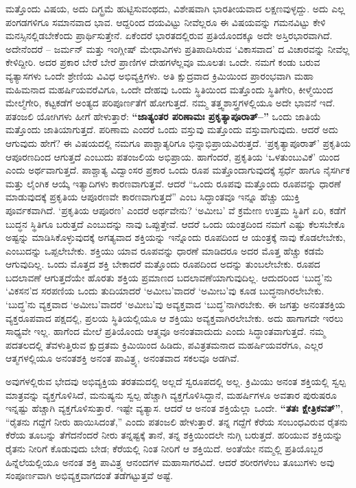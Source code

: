 ಮತ್ತೊಂದು ವಿಷಯ, ಅದು ದಿಗ್ಭ್ರಮೆ ಹುಟ್ಟಿಸುವಂಥದು, ವಿಶೇಷವಾಗಿ ಭಾರತೀಯವಾದ ಲಕ್ಷಣವುಳ್ಳದ್ದು. ಅದು ಎಲ್ಲ ಪಂಗಡಗಳಿಗೂ ಸಮಾನವಾದ ಭಾವ. ಆದ್ದರಿಂದ ದಯವಿಟ್ಟು ನೀವೆಲ್ಲರೂ ಈ ವಿಷಯವನ್ನು ಗಮನವಿಟ್ಟು ಕೇಳಿ ಮನಸ್ಸಿನಲ್ಲಿಡಬೇಕೆಂದು ಪ್ರಾರ್ಥಿಸುತ್ತೇನೆ. ಏಕೆಂದರೆ ಭಾರತದಲ್ಲಿರುವ ಪ್ರತಿಯೊಂದಕ್ಕೂ ಅದೇ ಅಸ್ತಿರಭಾರವಾಗಿದೆ. ಅದೇನೆಂದರೆ – ಜರ್ಮನ್​ ಮತ್ತು ಇಂಗ್ಲೀಷ್​ ಮೇಧಾವಿಗಳು ಪ್ರತಿಪಾದಿಸಿರುವ ‘ವಿಕಾಸವಾದ’ ದ ವಿಚಾರವನ್ನು ನೀವೆಲ್ಲ ಕೇಳಿದ್ದೀರಿ. ಅದರ ಪ್ರಕಾರ ಬೇರೆ ಬೇರೆ ಪ್ರಾಣಿಗಳ ದೇಹಗಳೆಲ್ಲವೂ ಮೂಲತಃ ಒಂದೇ. ನಮಗೆ ಕಂಡು ಬರುವ ವ್ಯತ್ಯಾಸಗಳು ಒಂದೇ ಶ್ರೇಣಿಯ ವಿವಿಧ ಅಭಿವ್ಯಕ್ತಿಗಳು. ಅತಿ ಕ್ಷುದ್ರವಾದ ಕ್ರಿಮಿಯಿಂದ ಪ್ರಾರಂಭವಾಗಿ ಮಹಾ ಮಹಿಮನಾದ ಮಹರ್ಷಿಯವರೆವಿಗೂ, ಒಂದೇ ದೇಹವು ಒಂದು ಸ್ಥಿತಿಯಿಂದ ಮತ್ತೊಂದು ಸ್ಥಿತಿಗೇರಿ, ಕೀಳ್ಮೆಯಿಂದ ಮೇಲ್ಮೆಗೇರಿ, ಕಟ್ಟಕಡೆಗೆ ಅಂತ್ಯದ ಪರಿಪೂರ್ಣತೆಗೆ ಹೋಗುತ್ತದೆ. ನಮ್ಮ ತತ್ತ್ವಶಾಸ್ತ್ರಗಳಲ್ಲಿಯೂ ಅದೇ ಭಾವನೆ ಇದೆ. ಪತಂಜಲಿ ಯೋಗಿಗಳು ಹೀಗೆ ಹೇಳುತ್ತಾರೆ: \textbf{“ಜಾತ್ಯಂತರ ಪರಿಣಾಮಃ ಪ್ರಕೃತ್ಯಾಪೂರಾತ್​–”} ಒಂದು ಜಾತಿಯೆ ಮತ್ತೊಂದು ಜಾತಿಯಾಗುತ್ತದೆ. ಪರಿಣಾಮ ಎಂದರೆ ಒಂದು ವಸ್ತುವು ಮತ್ತೊಂದು ವಸ್ತುವಾಗುವುದು. ಆದರೆ ಅದು ಆಗುವುದು ಹೇಗೆ? ಈ ವಿಷಯದಲ್ಲಿ ನಮಗೂ ಪಾಶ್ಚಾತ್ಯರಿಗೂ ಭಿನ್ನಾಭಿಪ್ರಾಯವಿರುತ್ತದೆ. ‘ಪ್ರಕೃತ್ಯಾಪೂರಾತ್​’ ಪ್ರಕೃತಿಯ ಆಪೂರಣದಿಂದ ಆಗುತ್ತದೆ ಎಂಬುದು ಪತಂಜಲಿಯ ಅಭಿಪ್ರಾಯ. ಹಾಗೆಂದರೆ, ಪ್ರಕೃತಿಯ ‘ಒಳತುಂಬುವಿಕೆ’ ಯಿಂದ ಎಂದು ಅರ್ಥವಾಗುತ್ತದೆ. ಪಾಶ್ಚಾತ್ಯ ವಿದ್ವಾಂಸರ ಪ್ರಕಾರ ಒಂದು ರೂಪ ಮತ್ತೊಂದಾಗುವುದಕ್ಕೆ ಸ್ಫರ್ಧೆ ಹಾಗೂ ನೈಸರ್ಗಿಕ ಮತ್ತು ಲೈಂಗಿಕ ಆಯ್ಕೆ ಇತ್ಯಾದಿಗಳು  ಕಾರಣವಾಗುತ್ತವೆ. ಆದರೆ “ಒಂದು ರೂಪವು ಮತ್ತೊಂದು ರೂಪವನ್ನು ಧಾರಣೆ ಮಾಡುವುದಕ್ಕೆ ಪ್ರಕೃತಿಯ ಆಪೂರಣವೇ ಕಾರಣವಾಗುತ್ತದೆ” ಎಂಬ ಸಿದ್ಧಾಂತವೂ ಇನ್ನೂ ಹೆಚ್ಚು ಯುಕ್ತಿ ಪೂರ್ವಕವಾಗಿದೆ. ‘ಪ್ರಕೃತಿಯ ಆಪೂರಣ’ ಎಂದರೆ ಅರ್ಥವೇನು? ‘ಅಮೀಬ’ ವೆ  ಕ್ರಮೇಣ ಉತ್ತಮ ಸ್ಥಿತಿಗೆ ಏರಿ, ಕಡೆಗೆ ಬುದ್ಧನ ಸ್ಥಿತಿಗೂ ಬರುತ್ತದೆ ಎಂಬುದನ್ನು ನಾವು ಒಪ್ಪುತ್ತೇವೆ. ಆದರೆ ಒಂದು ಯಂತ್ರದಿಂದ ನಮಗೆ ಎಷ್ಟು ಕೆಲಸಬೇಕೊ ಅಷ್ಟನ್ನು ಮಾಡಿಸಿಕೊಳ್ಳುವುದಕ್ಕೆ ಅಗತ್ಯವಾದ ಶಕ್ತಿಯನ್ನು ಇನ್ನೊಂದು ರೂಪದಿಂದ ಆ ಯಂತ್ರಕ್ಕೆ ನಾವು ಕೊಡಲೇಬೇಕು, ಎಂಬುದನ್ನು ಒಪ್ಪಲೇಬೇಕು. ಶಕ್ತಿಯು ಯಾವ ರೂಪವನ್ನು ಧಾರಣೆ ಮಾಡಿದರೂ ಅದರ ಮೊತ್ತ ಹೆಚ್ಚು ಕಡಮೆ ಆಗುವುದಿಲ್ಲ. ಒಂದು ಮೊತ್ತದ ಶಕ್ತಿ ಬೇಕಾದರೆ ಮತ್ತೊಂದು ರೂಪದಿಂದ ಅದನ್ನು ತುಂಬಲೇಬೇಕು. ರೂಪದ ಬದಲಾವಣೆ ಆಗುತ್ತದೆಯೇ ಹೊರತು ಶಕ್ತಿಯ ಪ್ರಮಾಣದ ಬದಲಾವಣೆಯಾಗುವುದಿಲ್ಲ. ಆದುದರಿಂದ ‘ಬುದ್ಧ’ನು ‘ವಿಕಸನ’ದ ಸರಪಣಿಯ ಒಂದು ತುದಿಯಾದರೆ ‘ಅಮೀಬ’ವಾದರೆ ‘ಅಮೀಬ’ವು ಕೂಡ ಬುದ್ಧನಾಗಿರಲೇಬೇಕು. ‘ಬುದ್ಧ’ನು ವ್ಯಕ್ತವಾದ ‘ಅಮೀಬ’ವಾದರೆ ‘ಅಮೀಬ’ವು ಅವ್ಯಕ್ತವಾದ ‘ಬುದ್ಧ’ನಾಗಿರಬೇಕು. ಈ ಜಗತ್ತು ಅನಂತಶಕ್ತಿಯ ವ್ಯಕ್ತರೂಪವಾದ ಪಕ್ಷದಲ್ಲಿ, ಪ್ರಲಯ ಸ್ಥಿತಿಯಲ್ಲಿಯೂ ಆ ಶಕ್ತಿಯು ಅವ್ಯಕ್ತವಾಗಿರಲೇಬೇಕು. ಅದು ಹಾಗಾಗದೇ ಇರಲು ಸಾಧ್ಯವೇ ಇಲ್ಲ. ಹಾಗೆಂದ ಮೇಲೆ ಪ್ರತಿಯೊಂದು ಆತ್ಮವೂ ಅನಂತವಾದುದು ಎಂದು ಸಿದ್ಧಾಂತವಾಗುತ್ತದೆ. ನಮ್ಮ ಪದತಲದಲ್ಲಿ ತೆವಳುತ್ತಿರುವ ಕ್ಷುದ್ರತಮ ಕ್ರಿಮಿಯಿಂದ ಹಿಡಿದು, ಪವಿತ್ರತಮನಾದ ಮಹರ್ಷಿಯವರೆಗೂ, ಎಲ್ಲರ ಆತ್ಮಗಳಲ್ಲಿಯೂ ಅನಂತಶಕ್ತಿ ಅನಂತ ಪಾವಿತ್ರ್ಯ, ಅನಂತವಾದ ಸಕಲವೂ ಅಡಗಿವೆ.

ಅವುಗಳಲ್ಲಿರುವ ಭೇದವು ಅಭಿವ್ಯಕ್ತಿಯ ತರತಮದಲ್ಲಿ ಅಲ್ಲದೆ ಸ್ವರೂಪದಲ್ಲಿ ಅಲ್ಲ. ಕ್ರಿಮಿಯು ಅನಂತ ಶಕ್ತಿಯಲ್ಲಿ ಸ್ವಲ್ಪ ಮಾತ್ರವನ್ನು ವ್ಯಕ್ತಗೊಳಿಸಿದೆ, ಮನುಷ್ಯನು ಸ್ವಲ್ಪ ಹೆಚ್ಚಾಗಿ ವ್ಯಕ್ತಗೊಳಿಸಿದ್ದಾನೆ, ಮಹರ್ಷಿಗಳೂ ಅವತಾರ ಪುರುಷರೂ ಇನ್ನಷ್ಟು ಹೆಚ್ಚಾಗಿ ವ್ಯಕ್ತಗೊಳಿಸುತ್ತಾರೆ. ಇಷ್ಟೇ ವ್ಯತ್ಯಾಸ. ಆದರೆ ಆ ಅನಂತ ಶಕ್ತಿಯೆಲ್ಲಾ ಒಂದೇ. \textbf{“ತತಃ ಕ್ಷೇತ್ರಿಕವತ್​”}, “ರೈತನು ಗದ್ದೆಗೆ ನೀರು ಹಾಯಿಸಿದಂತೆ,” ಎಂದು ಪತಂಜಲಿ ಹೇಳುತ್ತಾರೆ. ತನ್ನ ಗದ್ದೆಗೆ ಕೆರೆಯ ಸಂಬಂಧವಿರುವ ರೈತನು ಕೆರೆಯ ತೂಬನ್ನು ತೆಗೆದನೆಂದರೆ ನೀರು ತನ್ನಷ್ಟಕ್ಕೆ ತಾನೆ, ತನ್ನ ಶಕ್ತಿಯಿಂದಲೇ ನುಗ್ಗಿ ಬರುತ್ತದೆ. ಹರಿಯುವ ಶಕ್ತಿಯನ್ನು ರೈತನು ನೀರಿಗೆ ಕೊಡುವುದು ಬೇಡ; ಕೆರೆಯಲ್ಲಿ ನಿಂತ ನೀರಿಗೆ ಆ ಶಕ್ತಿಯಿದೆ. ಅಂತೆಯೇ ನಮ್ಮಲ್ಲಿ ಪ್ರತಿಯೊಬ್ಬರ ಹಿನ್ನೆಲೆಯಲ್ಲಿಯೂ ಅನಂತ ಶಕ್ತಿ ಪಾವಿತ್ರ್ಯ ಆನಂದಗಳ ಮಹಾಸಾಗರವಿದೆ. ಆದರೆ ಶರೀರಗಳೆಂಬ ತೂಬುಗಳು ಅವು ಸಂಪೂರ್ಣವಾಗಿ ಅಭಿವ್ಯಕ್ತವಾಗದಂತೆ ತಡೆಗಟ್ಟುತ್ತವೆ ಅಷ್ಟೆ.

